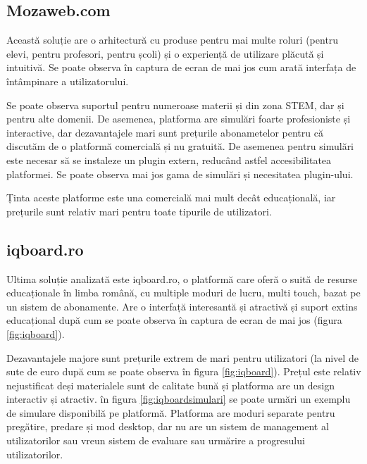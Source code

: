 \subsection{Mozaweb.com}

Această soluție are o arhitectură cu produse pentru mai multe roluri (pentru elevi, pentru profesori, pentru școli) și o experiență de utilizare
plăcută și intuitivă. Se poate observa în captura de ecran de mai jos cum arată interfața de întâmpinare a utilizatorului.


Se poate observa suportul pentru numeroase materii și din zona STEM, dar și pentru alte domenii. De asemenea, platforma are simulări foarte
profesioniste și interactive, dar dezavantajele mari sunt prețurile abonametelor pentru că discutăm de o platformă comercială și nu gratuită.
De asemenea pentru simulări este necesar să se instaleze un plugin extern, reducând astfel accesibilitatea platformei. Se poate observa mai jos
gama de simulări și necesitatea plugin-ului.


Ținta aceste platforme este una comercială mai mult decât educațională, iar prețurile sunt relativ mari pentru toate tipurile de utilizatori.


\subsection{iqboard.ro}

Ultima soluție analizată este iqboard.ro, o platformă care oferă o suită de resurse educaționale în limba română, cu multiple moduri 
de lucru, multi touch, bazat pe un sistem de abonamente. Are o interfață interesantă și atractivă și suport extins educațional după cum se poate observa
în captura de ecran de mai jos (figura \ref{fig:iqboard}). 

Dezavantajele majore sunt prețurile extrem de mari pentru utilizatori (la nivel de sute de euro după cum se poate observa în figura \ref{fig:iqboard}).
Prețul este relativ nejustificat deși materialele sunt de calitate bună și platforma are un design interactiv și atractiv.
în figura \ref{fig:iqboardsimulari} se poate urmări un exemplu de simulare disponibilă pe platformă. Platforma are moduri separate pentru 
pregătire, predare și mod desktop, dar nu are un sistem de management al utilizatorilor sau vreun sistem de evaluare sau 
urmărire a progresului utilizatorilor.

